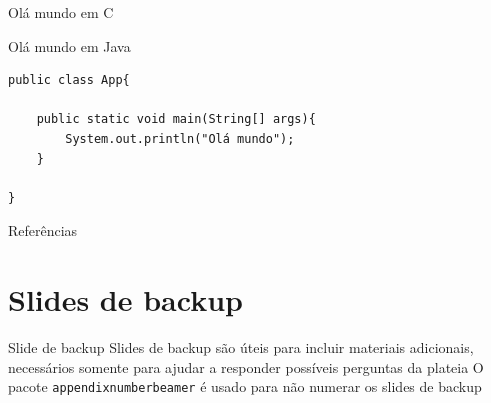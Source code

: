 \documentclass[aspectratio=169]{beamer}
\begin{document}
\begin{frame}[fragile]{Olá mundo em C}
    
\end{frame}

\begin{frame}[fragile]{Olá mundo em Java}
\begin{lstlisting}[style=java]
public class App{

    public static void main(String[] args){
        System.out.println("Olá mundo");
    }

}
\end{lstlisting}
\end{frame}

\begin{frame}{Referências}
    \nocite{*}
    
    
\end{frame}

\appendix

\section{Slides de backup}

\begin{frame}{Slide de backup}
    Slides de backup são úteis para incluir materiais adicionais, necessários somente para ajudar a responder possíveis perguntas da plateia
    \vfill
    O pacote \texttt{appendixnumberbeamer} é usado para não numerar os slides de backup
\end{frame}
\end{document}
